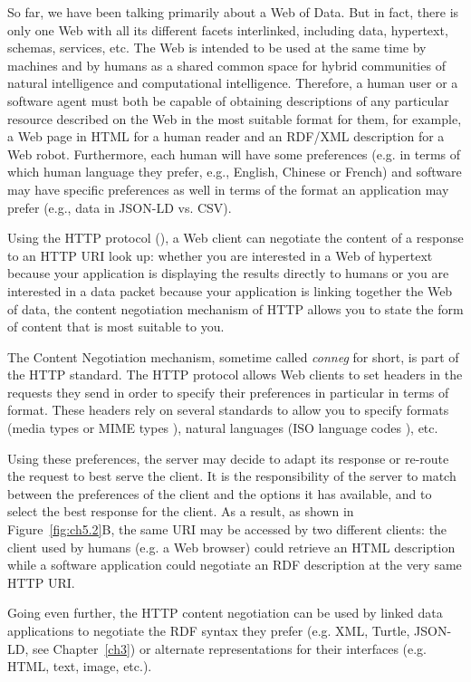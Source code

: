 So far, we have been talking primarily about a Web of Data.  But in fact, there  is only one
Web with all its different facets interlinked, including data, hypertext, schemas,
services, etc.  The Web is intended to be used at the same time by
machines and by humans as a shared common space for hybrid communities
of natural intelligence and computational intelligence. Therefore, a
human user or a software agent must both be capable of obtaining
descriptions of any particular resource described on the Web  in the most suitable
format for them, for example,  a Web page in HTML for a human reader  and an RDF/XML
description for a Web robot.   Furthermore, each human will have some preferences (e.g.
in terms of which human language they prefer, e.g.,  English, Chinese or French) and
software may have specific preferences as well  in terms of the format an application may prefer (e.g., 
data in JSON-LD vs. CSV).

Using the HTTP protocol (\cite{leach1999hypertext}), a Web client
can negotiate the content of a response to an HTTP URI look up: whether
you are interested in a Web of hypertext because your application is
displaying the results directly to humans or you are interested in a data packet 
because your application is linking together the Web of data, 
the content negotiation mechanism of HTTP
allows you to state the form of content that is most suitable to you.

The Content Negotiation mechanism, sometime called \emph{conneg} for short, is part of the
HTTP standard. The HTTP protocol allows Web clients to set headers in
the requests they send in order to specify their preferences in
particular in terms of format. These headers rely on several standards
to allow you to specify formats (media types or MIME types \cite{klensin2013media}), 
natural languages (ISO
language codes \cite{iso_language_639}), etc.

Using these preferences, the server may decide to adapt its response or
re-route the request to best serve the client. It is the responsibility
of the server to match between the preferences of the client and the
options it has available, and to select the best response for the
client. As a result, as shown in Figure~\ref{fig:ch5.2}B,  the same URI may be accessed
by two different clients: the client used by humans (e.g. a Web browser)
could retrieve an HTML description while a software  application could
negotiate an RDF description at the very same HTTP URI.

Going even further, the HTTP content negotiation can be used by linked
data applications to negotiate the RDF syntax they prefer (e.g. XML,
Turtle, JSON-LD, see Chapter~\ref{ch3}) or alternate representations for their interfaces (e.g.
HTML, text, image, etc.).


